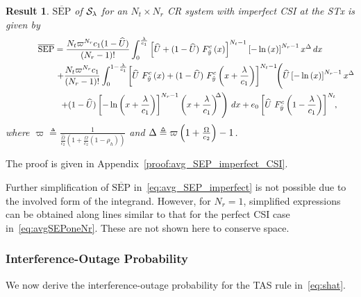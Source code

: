 \documentclass[12pt,draftcls,peerreview,onecolumn]{IEEEtran}
\newtheorem{result}{{\bf Result}}
\newcommand{\define}{\triangleq}
\newcommand{\SEP}{\text{SEP}}
\newcommand{\lam}{\lambda}
\newcommand{\Nt}{{N_t}}
\newcommand{\Nr}{{N_r}}
\newcommand{\cone}{c_{1}}
\newcommand{\ctwo}{c_{2}}
\newcommand{\lambym}{\frac{\lam}{\cone}}
\newcommand{\al}{\ctwo}
\newcommand{\snr}{\Omega}
\newcommand{\snrbyal}[1][]{\frac{\snr#1}{\al}}
\newcommand{\un}{U}
\newcommand{\zerosep}{e_0}
\newcommand{\callamrule}{{\cal S_{{\lam}}}}
\newcommand{\avgSEP}{\overline{\SEP}}
\newcommand{\unhat}{\widehat{\un}}
\newcommand{\snrhat}{\widehat{\snr}}
\newcommand{\snrhatbyal}[1][]{\frac{\snrhat#1}{\al}}
\newcommand{\rhoh}{\rho_h}
\newcommand{\Tc}{\frac{1}{\snrhatbyal\left(1 + \snrbyal\left(1 - \rhoh \right)  \right) }}
\newcommand{\T}{\varpi}
\newcommand{\Dc}{\T \left( 1 + \snrbyal\right) -1}
\begin{document}
\begin{result}
\label{thm:avg_SEP_imperfect}
$\avgSEP$ of $\callamrule$ for an $\Nt\times\Nr$ CR system with imperfect CSI at the STx is given by
\begin{multline}
\label{eq:avg_SEP_imperfect}
\avgSEP = \frac{\Nt \T^{\Nr}\cone(1-\unhat)}{(\Nr-1)!} \int_{0}^{\lambym} \left[\unhat + \unccdfyhat{(1-\unhat)}{x}\right]^{\Nt-1} \yhattimespdfyNr\, dx\\
\hspace{60pt} + \frac{\Nt \T^{\Nr}\cone}{(\Nr-1)!} \int_{0}^{1-\lambym}
\!\left[\unccdfyhat{\unhat}{x} + \unccdfyhat{(1-\unhat)}{x+\lambym} \right]^{\Nt-1} \!\!\Bigg(\unhat\yhattimespdfyNr  \\ 
\hspace{40pt}\left. + (1-\unhat)\yhatpluslamtimespdfyNr\right)\, dx 
+\zerosep\left[\unccdfyhat{\unhat}{1-\lambym}\right]^{\Nt}\!\!,\!\!
\end{multline}
where $\T \define \Tc$ and $\D \define \Dc$.	
\end{result}
\begin{IEEEproof}
	The proof is given in Appendix~\ref{proof:avg_SEP_imperfect_CSI}.
\end{IEEEproof}

Further simplification of $\avgSEP$ in~\eqref{eq:avg_SEP_imperfect} is not possible due to the involved form of the integrand. However, for $\Nr=1$, simplified expressions can be obtained along lines similar to that for the perfect CSI case in~\eqref{eq:avgSEPoneNr}. These are not shown here to conserve space.



\subsubsection{ Interference-Outage Probability} We now derive the interference-outage probability for the TAS rule in~\eqref{eq:shat}.
\end{document}
